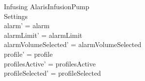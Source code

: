 \begin{schema}{Infusing}
	\Delta AlarisInfusionPump\\
	Settings\\
	\where
	alarm' = alarm\\
	alarmLimit' = alarmLimit\\
	alarmVolumeSelected' = alarmVolumeSelected\\
	profile' = profile\\
	profilesActive' = profilesActive\\  
	 \pagebreak
	  profileSelected' = profileSelected\\
	 

\end{schema}
